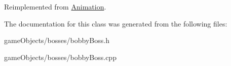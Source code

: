 Reimplemented from \hyperlink{class_animation_ae17ebf5f4b47801e460eb63342d858e8}{Animation}.



The documentation for this class was generated from the following files\+:\begin{DoxyCompactItemize}
\item 
game\+Objects/bosses/bobby\+Boss.\+h\item 
game\+Objects/bosses/bobby\+Boss.\+cpp\end{DoxyCompactItemize}
